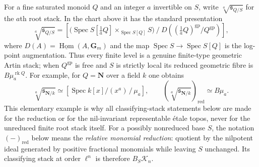 \documentclass[11pt]{article}
\theoremstyle{definition}
\theoremstyle{remark}
\begin{document}
For a fine saturated monoid $Q$ and an integer $a$ invertible on $S$, write
$\sqrt[a]{\mathfrak s_{Q/S}}$ for the $a$th root stack.  In the chart above
it has the standard presentation
\[
 \sqrt[a]{\mathfrak s_{Q/S}}
 =\left[
   \bigl(\operatorname{Spec}S[\tfrac1aQ]
        \times_{\operatorname{Spec}S[Q]}S\bigr)
   \mathbin{/}
   D\!\left((\tfrac1aQ)^{\mathrm{gp}}/Q^{\mathrm{gp}}\right)
  \right],
\]
where $D(A)=\underline{\operatorname{Hom}}(A,\mathbf G_m)$ and the map
$\operatorname{Spec}S\to\operatorname{Spec}S[Q]$ is the log-point
augmentation.  Thus every finite level is a genuine finite-type geometric
Artin stack; when $Q^{\mathrm{gp}}$ is free and $S$ is strictly local its
 reduced geometric fibre is $B\mu_a^{\operatorname{rk}Q}$.
For example, for $Q=\mathbf N$ over a field $k$ one obtains
\[
 \sqrt[a]{\mathfrak s_{\mathbf N/k}}
 \simeq[\operatorname{Spec}k[x]/(x^a)\,/\,\mu_a],
 \qquad
 (\sqrt[a]{\mathfrak s_{\mathbf N/k}})_{\mathrm{red}}
 \simeq B\mu_a.
\]
This elementary example is why all classifying-stack statements below are
made for the reduction or for the nil-invariant representable \'{e}tale topos,
never for the unreduced finite root stack itself.
For a possibly nonreduced base $S$, the notation $(-)_{\mathrm{red}}$ below
means the \emph{relative monomial reduction}: quotient by the nilpotent ideal
generated by positive fractional monomials while leaving $S$ unchanged.  Its
 classifying stack at order $\ell^n$ is therefore $B_S\mathcal K_n$.
\end{document}
